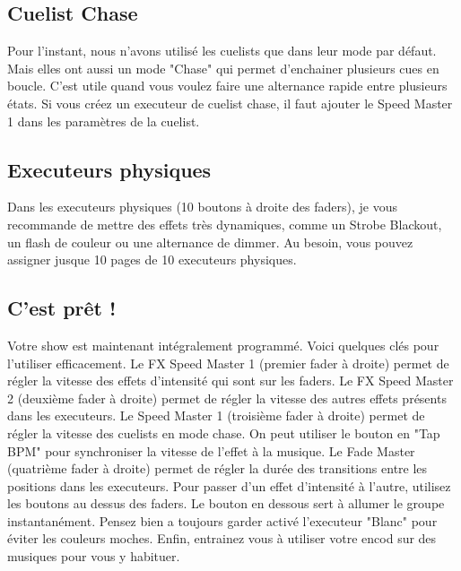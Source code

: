 \subsection{Cuelist Chase}
\label{subsec:exec_cuelist_chase}

Pour l'instant, nous n'avons utilisé les cuelists que dans leur mode par défaut.
Mais elles ont aussi un mode "Chase" qui permet d'enchainer plusieurs cues en boucle.
C'est utile quand vous voulez faire une alternance rapide entre plusieurs états.
\newline
Si vous créez un executeur de cuelist chase, il faut ajouter le Speed Master 1 dans les paramètres de la cuelist.

\subsection{Executeurs physiques}
\label{subsec:exec_physiques}

Dans les executeurs physiques (10 boutons à droite des faders), je vous recommande de mettre des effets très dynamiques,
comme un Strobe Blackout, un flash de couleur ou une alternance de dimmer.
\newline
Au besoin, vous pouvez assigner jusque 10 pages de 10 executeurs physiques.

\subsection{C'est prêt !}
\label{subsec:exec_pret}

Votre show est maintenant intégralement programmé. Voici quelques clés pour l'utiliser efficacement.
Le FX Speed Master 1 (premier fader à droite) permet de régler la vitesse des effets d'intensité qui sont sur les faders.
Le FX Speed Master 2 (deuxième fader à droite) permet de régler la vitesse des autres effets présents dans les executeurs.
Le Speed Master 1 (troisième fader à droite) permet de régler la vitesse des cuelists en mode chase. On peut utiliser le bouton en "Tap BPM" pour synchroniser la vitesse de l'effet à la musique.
Le Fade Master (quatrième fader à droite) permet de régler la durée des transitions entre les positions dans les executeurs.
\newline
\newline
Pour passer d'un effet d'intensité à l'autre, utilisez les boutons au dessus des faders. Le bouton en dessous sert à allumer le groupe instantanément.
\newline
\newline
Pensez bien a toujours garder activé l'executeur "Blanc" pour éviter les couleurs moches.
\newline
\newline
Enfin, entrainez vous à utiliser votre encod sur des musiques pour vous y habituer.
